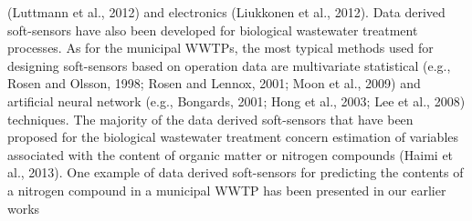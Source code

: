 
(Luttmann et al., 2012) and electronics (Liukkonen et al., 2012). Data derived soft-sensors have also been developed for biological wastewater treatment processes. As for the municipal WWTPs, the most typical methods used for designing soft-sensors based on operation data are multivariate statistical (e.g., Rosen and Olsson, 1998; Rosen and Lennox, 2001; Moon et al., 2009) and artificial neural network (e.g., Bongards, 2001; Hong et al., 2003; Lee et al., 2008) techniques. The majority of the data derived soft-sensors that have been proposed for the biological wastewater treatment concern estimation of variables associated with the content of organic matter or nitrogen compounds (Haimi et al., 2013). One example of data derived soft-sensors for predicting the contents of a nitrogen compound in a municipal WWTP has been presented in our earlier works



